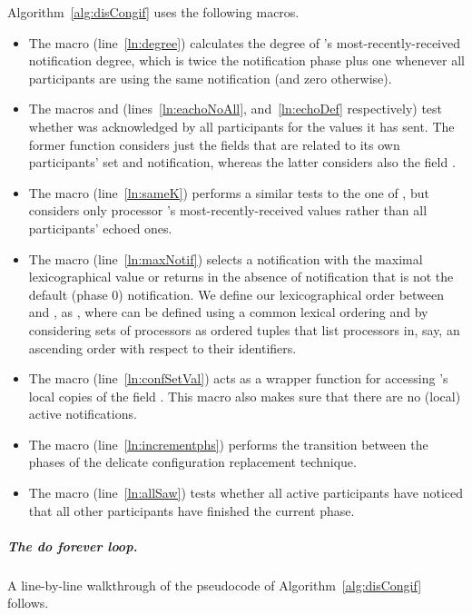 \documentclass[11pt]{article}
\newcommand{\boldsubparagraph}[1]{\subparagraph{\bf #1}}
\begin{document}
Algorithm~\ref{alg:disCongif} uses the following macros. 

\begin{itemize}

\item The macro  (line~\ref{ln:degree}) calculates the degree of 's most-recently-received notification degree, which is twice the notification phase plus one whenever all participants are using the same notification (and zero otherwise).
 

\item The macros  and  (lines~\ref{ln:eachoNoAll}, and~\ref{ln:echoDef} respectively) test whether  was acknowledged by all participants for the values it has sent. The former function considers just the fields that are related to its own participants' set and notification, whereas the latter considers also the field . 

\item The macro  (line~\ref{ln:sameK}) performs a similar tests to the one of , but considers only processor 's most-recently-received values rather than all participants' echoed ones.


\item The macro  (line~\ref{ln:maxNotif}) selects a notification with the maximal lexicographical value or returns  in the absence of notification that is not the default (phase 0) notification. We define our lexicographical order   between  and , as , where  can be defined using a common lexical ordering and by considering sets of processors as ordered tuples that list processors in, say, an ascending order with respect to their identifiers.

\item The macro  (line~\ref{ln:confSetVal}) acts as a wrapper function for accessing 's local copies of the field . This macro also makes sure that there are no (local) active notifications.

\item The macro  (line~\ref{ln:incrementphs}) performs the transition between the phases of the delicate configuration replacement technique.

\item The macro  (line~\ref{ln:allSaw}) tests whether all active participants have noticed that all other participants have finished the current phase.


\end{itemize}




\boldsubparagraph{The do forever loop.} 
A line-by-line walkthrough of the pseudocode of Algorithm~\ref{alg:disCongif} follows.
\end{document}
